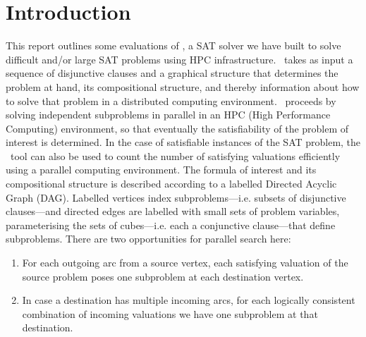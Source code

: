 \documentclass[
10pt, %
a4paper, %
oneside, %
headinclude,footinclude, %
BCOR5mm, %
]{scrartcl}
\begin{document}
\newpage %


\section{Introduction}

This report outlines some evaluations of \dagster, a SAT solver we have built to solve difficult and/or large SAT problems using HPC infrastructure.
\dagster\ takes as input a sequence of disjunctive clauses and a graphical structure that determines the problem at hand, its compositional structure, and thereby information about how to solve that problem in a distributed computing environment.
\dagster\ proceeds by solving independent subproblems in parallel in an HPC (High Performance Computing) environment, so that eventually the satisfiability of the problem of interest is determined.
In the case of satisfiable instances of the SAT problem, the \dagster\ tool can also be used to count the number of satisfying valuations efficiently using a parallel computing environment. 
The formula of interest and its compositional structure is described according to a labelled Directed Acyclic Graph (DAG).
Labelled vertices index subproblems---i.e. subsets of disjunctive clauses---and directed edges are labelled with small sets of problem variables, parameterising the sets of cubes---i.e. each a conjunctive clause---that define subproblems.
There are two opportunities for parallel search here:
\begin{enumerate}
\item For each outgoing arc from a source vertex, each satisfying valuation of the source problem poses one subproblem at each destination vertex.
\item In case a destination has multiple incoming arcs, for each logically consistent combination of incoming valuations we have one subproblem at that destination.
\end{enumerate}
\end{document}
